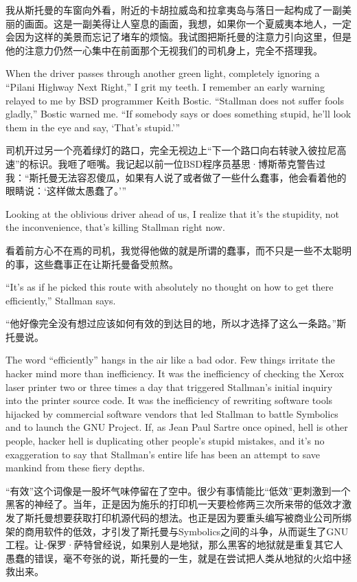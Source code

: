 \ifdefined\chs
我从斯托曼的车窗向外看，附近的卡胡拉威岛和拉拿夷岛与落日一起构成了一副美丽的画面。这是一副美得让人窒息的画面，我想，如果你一个夏威夷本地人，一定会因为这样的美景而忘记了堵车的烦恼。我试图把斯托曼的注意力引向这里，但是他的注意力仍然一心集中在前面那个无视我们的司机身上，完全不搭理我。
\fi

\ifdefined\eng
When the driver passes through another green light, completely ignoring a ``Pilani Highway Next Right,'' I grit my teeth. I remember an early warning relayed to me by BSD programmer Keith Bostic. ``Stallman does not suffer fools gladly,'' Bostic warned me. ``If somebody says or does something stupid, he'll look them in the eye and say, `That's stupid.'\hspace{0.01in}''
\fi

\ifdefined\chs
司机开过另一个亮着绿灯的路口，完全无视边上``下一个路口向右转驶入彼拉尼高速''的标识。我咂了咂嘴。我记起以前一位BSD程序员基思·博斯蒂克警告过我：``斯托曼无法容忍傻瓜，如果有人说了或者做了一些什么蠢事，他会看着他的眼睛说：`这样做太愚蠢了。'\hspace{0.01in}''
\fi

\ifdefined\eng
Looking at the oblivious driver ahead of us, I realize that it's the stupidity, not the inconvenience, that's killing Stallman right now.
\fi

\ifdefined\chs
看着前方心不在焉的司机，我觉得他做的就是所谓的蠢事，而不只是一些不太聪明的事，这些蠢事正在让斯托曼备受煎熬。
\fi

\ifdefined\eng
``It's as if he picked this route with absolutely no thought on how to get there efficiently,'' Stallman says.
\fi

\ifdefined\chs
``他好像完全没有想过应该如何有效的到达目的地，所以才选择了这么一条路。''斯托曼说。
\fi

\ifdefined\eng
The word ``efficiently'' hangs in the air like a bad odor. Few things irritate the hacker mind more than inefficiency. It was the inefficiency of checking the Xerox laser printer two or three times a day that triggered Stallman's initial inquiry into the printer source code. It was the inefficiency of rewriting software tools hijacked by commercial software vendors that led Stallman to battle Symbolics and to launch the GNU Project. If, as Jean Paul Sartre once opined, hell is other people, hacker hell is duplicating other people's stupid mistakes, and it's no exaggeration to say that Stallman's entire life has been an attempt to save mankind from these fiery depths.
\fi

\ifdefined\chs
``有效''这个词像是一股坏气味停留在了空中。很少有事情能比``低效''更刺激到一个黑客的神经了。当年，正是因为施乐的打印机一天要检修两三次所来带的低效才激发了斯托曼想要获取打印机源代码的想法。也正是因为要重头编写被商业公司所绑架的商用软件的低效，才引发了斯托曼与Symbolics之间的斗争，从而诞生了GNU工程。让-保罗·萨特曾经说，如果别人是地狱，那么黑客的地狱就是重复其它人愚蠢的错误，毫不夸张的说，斯托曼的一生，就是在尝试把人类从地狱的火焰中拯救出来。
\fi

